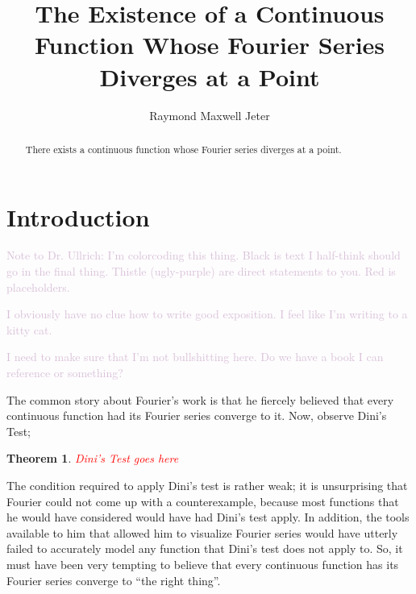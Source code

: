 \documentclass{amsart}
\newcommand{\colorcomment}[2]{\textcolor{#1}{#2}} %
\newtheorem{thm}{Theorem}[section]
\theoremstyle{definition}
\begin{document}
\title{The Existence of a Continuous Function Whose Fourier Series Diverges at a Point}
\author{Raymond Maxwell Jeter}

\begin{abstract}
There exists a continuous function whose Fourier series diverges at a point.
\end{abstract}

\maketitle

\section{Introduction}

\colorcomment{Thistle}{Note to Dr. Ullrich: I'm colorcoding this thing. Black is text I half-think should go in the final thing. Thistle (ugly-purple) are direct statements to you. Red is placeholders.}

\colorcomment{Thistle}{I obviously have no clue how to write good exposition. I feel like I'm writing to a kitty cat.}

\colorcomment{Thistle}{I need to make sure that I'm not bullshitting here. Do we have a book I can reference or something?}


The common story about Fourier's work is that he fiercely believed that every continuous function had its Fourier series converge to it. 
Now, observe Dini's Test;

\begin{thm}
\colorcomment{red}{Dini's Test goes here}
\end{thm}

The condition required to apply Dini's test is rather weak; it is unsurprising that Fourier could not come up with a counterexample, because most functions that he would have considered would have had Dini's test apply. 
In addition, the tools available to him that allowed him to visualize Fourier series would have utterly failed to accurately model any function that Dini's test does not apply to. 
So, it must have been very tempting to believe that every continuous function has its Fourier series converge to ``the right thing''.
\end{document}

